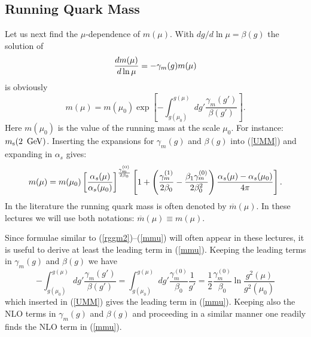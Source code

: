 \documentclass[12pt]{article}
\def\as{\alpha_s}
\newcommand{\ms}{m_{\rm s}}
\newcommand{\gev}{\, {\rm GeV}}
\newcommand{\be}{\begin{equation}}
\newcommand{\ee}{\end{equation}}
\begin{document}
\begin{itemize}
\begin{itemize}
\subsection{Running Quark Mass}
Let us next find the $\mu$-dependence of $m(\mu)$. With
$dg/d\ln\mu=\beta(g)$ the solution of
\begin{equation}\label{rggm2}
{d m(\mu)\over d\ln\mu}=-\gamma_m(g) m(\mu)  
\end{equation}
is obviously
\begin{equation}\label{UMM}
 m(\mu) = m(\mu_0) \exp \left[ 
  - \int_{g(\mu_0)}^{g(\mu)}{dg' \frac{\gamma_m(g')}{\beta(g')}}\right]. 
\end{equation}
Here
$m(\mu_0)$ is the
value of the running mass at the scale $\mu_0$. For instance:
$\ms(2~\gev)$. 
Inserting the expansions for $\gamma_m(g)$ and $\beta(g)$ into (\ref{UMM}) 
and expanding in $\as$ gives:
\begin{equation}\label{mmu}
m(\mu)=
m(\mu_0)
\left[{\as(\mu)\over\as(\mu_0)}\right]^{\gamma^{(0)}_m\over 2\beta_0}
\left[1+\left({\gamma^{(1)}_{m}\over 2\beta_0}-{\beta_1\gamma^{(0)}_{m}\over
  2\beta^2_0}\right){\as(\mu)-\as(\mu_0)\over 4\pi}\right].
\end{equation}
In the literature the running quark mass is often denoted by
$\overline{m}(\mu)$. In these lectures we will use both notations:
$\overline{m}(\mu)\equiv {m}(\mu)$.

Since formulae similar to (\ref{rggm2})--(\ref{mmu}) will
often appear in these lectures, it is useful to derive at least the
leading term in (\ref{mmu}).
Keeping the leading terms in $\gamma_m(g)$ and $\beta(g)$ we have
\be
  - \int_{g(\mu_0)}^{g(\mu)} dg' \frac{\gamma_m(g')}{\beta(g')}
  = \int_{g(\mu_0)}^{g(\mu)} dg' \frac{\gamma_m^{(0)}}{\beta_0}
    \frac{1}{g'}=\frac{1}{2} \frac{\gamma_m^{(0)}}{\beta_0}
    \ln\frac{g^2(\mu)}{g^2(\mu_0)}
\ee
which inserted in (\ref{UMM}) gives the leading term in (\ref{mmu}).
Keeping also the NLO terms in $\gamma_m(g)$ and $\beta(g)$ and
proceeding in a similar manner one readily finds the NLO term
in (\ref{mmu}).


\end{itemize}
\end{itemize}
\end{document}
